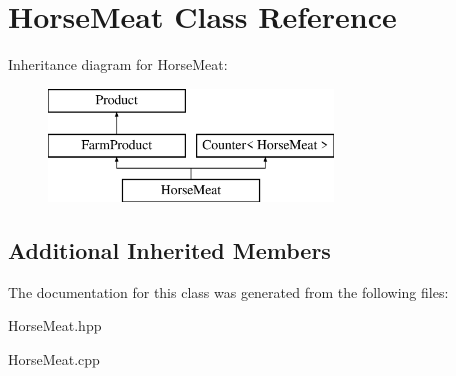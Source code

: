 \hypertarget{class_horse_meat}{}\section{Horse\+Meat Class Reference}
\label{class_horse_meat}
Inheritance diagram for Horse\+Meat\+:\begin{figure}[H]
\begin{center}
\leavevmode
\includegraphics[height=3.000000cm]{class_horse_meat}
\end{center}
\end{figure}
\subsection*{Additional Inherited Members}


The documentation for this class was generated from the following files\+:\begin{DoxyCompactItemize}
\item 
Horse\+Meat.\+hpp\item 
Horse\+Meat.\+cpp\end{DoxyCompactItemize}
